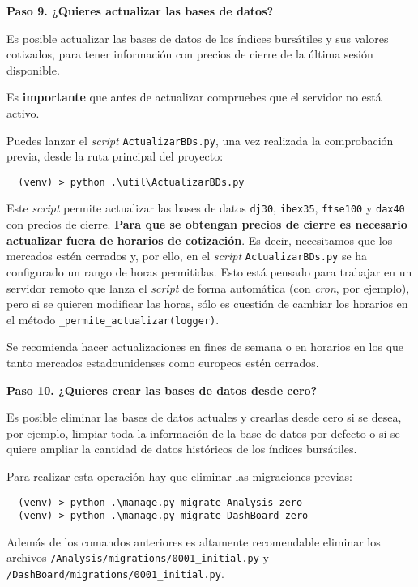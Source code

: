 \newpage
\textbf{Paso 9. ¿Quieres actualizar las bases de datos?}

Es posible actualizar las bases de datos de los índices bursátiles y sus valores cotizados, para tener información con precios de cierre de la última sesión disponible.

Es \textbf{importante} que antes de actualizar compruebes que el servidor no está activo.

Puedes lanzar el \emph{script} \texttt{ActualizarBDs.py}, una vez realizada la comprobación previa, desde la ruta principal del proyecto:

\begin{verbatim}
  (venv) > python .\util\ActualizarBDs.py
\end{verbatim}

Este \emph{script} permite actualizar las bases de datos \texttt{dj30}, \texttt{ibex35}, \texttt{ftse100} y \texttt{dax40} con precios de cierre. \textbf{Para que se obtengan precios de cierre es necesario actualizar fuera de horarios de cotización}. Es decir, necesitamos que los mercados estén cerrados y, por ello, en el \emph{script} \texttt{ActualizarBDs.py} se ha configurado un rango de horas permitidas. Esto está pensado para trabajar en un servidor remoto que lanza el \emph{script} de forma automática (con \emph{cron}, por ejemplo), pero si se quieren modificar las horas, sólo es cuestión de cambiar los horarios en el método \texttt{\_permite\_actualizar(logger)}.

Se recomienda hacer actualizaciones en fines de semana o en horarios en los que tanto mercados estadounidenses como europeos estén cerrados.



\textbf{Paso 10. ¿Quieres crear las bases de datos desde cero?}

Es posible eliminar las bases de datos actuales y crearlas desde cero si se desea, por ejemplo, limpiar toda la información de la base de datos por defecto o si se quiere ampliar la cantidad de datos históricos de los índices bursátiles.

Para realizar esta operación hay que eliminar las migraciones previas:

\begin{verbatim}
  (venv) > python .\manage.py migrate Analysis zero
  (venv) > python .\manage.py migrate DashBoard zero
\end{verbatim}

Además de los comandos anteriores es altamente recomendable eliminar los archivos \texttt{/Analysis/migrations/0001\_initial.py} y \\ \texttt{/DashBoard/migrations/0001\_initial.py}.


